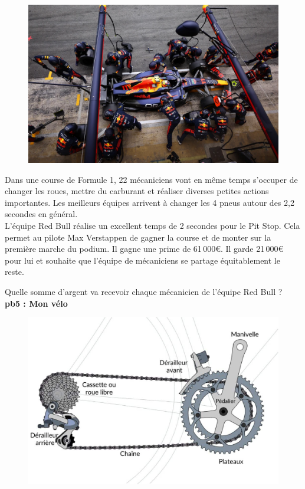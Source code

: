 \begin{multicols}{2} 

\begin{figure}[H]
  \centering
  \includegraphics[width=0.8\linewidth]{5x2-inegalite-triangulaire/f1.png}
\end{figure}  \columnbreak

Dans une course de Formule 1, 22 mécaniciens vont en même temps s'occuper de changer les roues, mettre du carburant et réaliser diverses petites actions importantes. Les meilleurs équipes arrivent à changer les 4 pneus autour des 2,2 secondes en général. \\

L'équipe Red Bull réalise un excellent temps de 2 secondes pour le Pit Stop. Cela permet au pilote Max Verstappen de gagner la course et de monter sur la première marche du podium. Il gagne une prime de 61\,000€. Il garde 21\,000€ pour lui et souhaite que l'équipe de mécaniciens se partage équitablement le reste. \\
\end{multicols}


Quelle somme d'argent va recevoir chaque mécanicien de l'équipe Red Bull ?\\

\textbf{pb5 : Mon vélo} \\

\begin{figure}[H]
  \centering
  \includegraphics[width=0.4\linewidth]{5x2-inegalite-triangulaire/velo.jpg}
\end{figure} 

